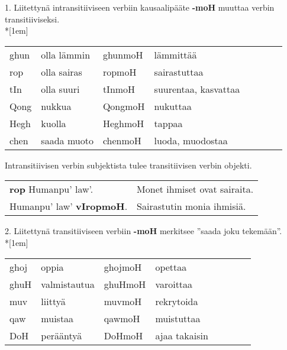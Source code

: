 \documentclass{book}
\begin{document}
1. Liitettynä intransitiiviseen verbiin kausaalipääte \textbf{-moH} muuttaa verbin transitiiviseksi.
\\*[1em]
\begin{tabular}{Bl Il | Bl Il}
    ghun & olla lämmin & ghunmoH & lämmittää \\
    rop & olla sairas & ropmoH & sairastuttaa \\
    tIn & olla suuri & tInmoH & suurentaa, kasvattaa \\
    Qong & nukkua & QongmoH & nukuttaa \\
    Hegh & kuolla & HeghmoH & tappaa \\
    chen & saada muoto & chenmoH & luoda, muodostaa \\
\end{tabular}

Intransitiivisen verbin subjektista tulee transitiivisen verbin objekti.

\ifxetex
\else
    \begin{tabular}{l l}
        \textbf{rop} Humanpu' law'. & Monet ihmiset ovat sairaita. \\
        Humanpu' law' \textbf{vIropmoH}. & Sairastutin monia ihmisiä. \\
    \end{tabular}
\fi

2. Liitettynä transitiiviseen verbiin \textbf{-moH} merkitsee ''saada joku tekemään''.\\*[1em]
\begin{tabular}{Bl Il | Bl Il}
    ghoj & oppia & ghojmoH & opettaa \\
    ghuH & valmistautua & ghuHmoH & varoittaa \\
    muv & liittyä & muvmoH & rekrytoida \\
    qaw & muistaa & qawmoH & muistuttaa \\
    DoH & perääntyä & DoHmoH & ajaa takaisin \\
\end{tabular}
\end{document}
